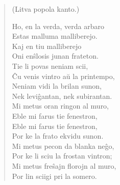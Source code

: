 \begin{verse}
\begin{center}
\footnotesize (Litva popola kanto.)
\end{center}
                     Ho, en la verda, verda arbaro\\
                     Estas malluma malliberejo.\\
                     Kaj en tiu malliberejo\\
                     Oni en\^slosis junan frateton.\\
                     Tie li povas neniam scii,\\
                     \^Cu venis vintro a\u u la printempo,\\
                     Neniam vidi la brilan sunon,\\
                     Nek levi\^gantan, nek subirantan.\\
                     Mi metus oran ringon al muro,\\
                     Eble mi farus tie fenestron,\\
                     Eble mi farus tie fenestron,\\
                     Por ke la frato ekvidu sunon.\\
                     Mi metus pecon da blanka ne\^go,\\
                     Por ke li sciu la frostan vintron;\\
                     Mi metus fre\^sajn florojn al muro,\\
                     Por lin sciigi pri la somero.

\end{verse}


\smallrule{}
